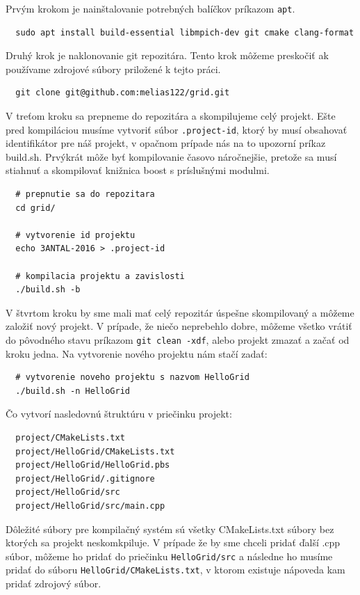 Prvým krokom je nainštalovanie potrebných balíčkov príkazom \texttt{apt}.
\begin{lstlisting}
  sudo apt install build-essential libmpich-dev git cmake clang-format
\end{lstlisting}
Druhý krok je naklonovanie git repozitára. Tento krok môžeme preskočiť ak používame zdrojové súbory priložené k tejto práci.
\begin{lstlisting}
  git clone git@github.com:melias122/grid.git
\end{lstlisting}
V treťom kroku sa prepneme do repozitára a skompilujeme celý projekt.
Ešte pred kompiláciou musíme vytvoriť súbor \texttt{.project-id}, ktorý by musí obsahovať
identifikátor pre náš projekt, v opačnom prípade nás na to upozorní príkaz build.sh.
Prvýkrát môže byť kompilovanie časovo náročnejšie, pretože sa musí stiahnuť a skompilovať knižnica boost s príslušnými modulmi. 
\begin{lstlisting}
  # prepnutie sa do repozitara
  cd grid/

  # vytvorenie id projektu
  echo 3ANTAL-2016 > .project-id

  # kompilacia projektu a zavislosti
  ./build.sh -b
\end{lstlisting}
V štvrtom kroku by sme mali mať celý repozitár úspešne skompilovaný a môžeme založiť nový projekt.
V prípade, že niečo neprebehlo dobre, môžeme všetko vrátiť do pôvodného stavu príkazom \texttt{git clean -xdf}, alebo projekt zmazať a začať od kroku jedna.
Na vytvorenie nového projektu nám stačí zadať:
\begin{lstlisting}
  # vytvorenie noveho projektu s nazvom HelloGrid
  ./build.sh -n HelloGrid
\end{lstlisting}
Čo vytvorí nasledovnú štruktúru v priečinku projekt:
\begin{lstlisting}
  project/CMakeLists.txt
  project/HelloGrid/CMakeLists.txt
  project/HelloGrid/HelloGrid.pbs
  project/HelloGrid/.gitignore
  project/HelloGrid/src
  project/HelloGrid/src/main.cpp
\end{lstlisting}
Dôležité súbory pre kompilačný systém sú všetky CMakeLists.txt súbory bez ktorých sa projekt neskomkpiluje.
V prípade že by sme chceli pridať ďalší .cpp súbor, môžeme ho pridať do priečinku \texttt{HelloGrid/src} a následne ho musíme pridať do
súboru \texttt{HelloGrid/CMakeLists.txt}, v ktorom existuje nápoveda kam pridať zdrojový súbor.

